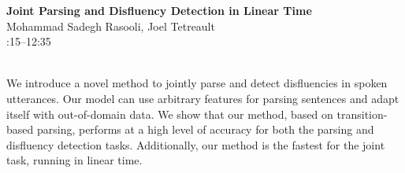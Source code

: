 \documentclass[twoside,makeidx]{book}
\renewcommand{\normalsize}{\fontsize{8}{9}\selectfont}
\renewcommand{\small}{\fontsize{7}{8}\selectfont}
\begin{document}
\par\vspace{2em}\noindent%
\begin{minipage}{\linewidth}%
\begin{center}
\textbf{\normalsize Joint Parsing and Disfluency Detection in Linear Time}\\
\normalsize  Mohammad Sadegh Rasooli,  Joel Tetreault\\
{\small 12:15--12:35}\\
\end{center}
\end{minipage}\\[0.5em]
\nopagebreak%
\noindent%
{\small We introduce a novel method to jointly parse and detect disfluencies in spoken utterances.  Our model can use arbitrary features for parsing sentences and adapt itself with out-of-domain data.  We show that our method, based on transition-based parsing, performs at a high level of accuracy for both the parsing and disfluency detection tasks.  Additionally, our method is the fastest for the joint task, running in linear time.}
\clearpage
\end{document}
